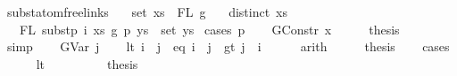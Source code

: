 \begin{isabellebody}
%
\endisatagproof
{\isafoldproof}%
%
\isadelimproof
%
\endisadelimproof
%
\isadelimdocument
%
\endisadelimdocument
%
\isatagdocument
%
\isamarkuptrue%
%
\endisatagdocument
{\isafolddocument}%
%
\isadelimdocument
%
\endisadelimdocument
{}\isamarkupfalse%
\ subst{\isacharunderscore}{\kern0pt}atom{\isacharunderscore}{\kern0pt}freelinks{\isacharcolon}{\kern0pt}\isanewline
\ \ \ {\isachardoublequoteopen}set\ xs\ {\isacharequal}{\kern0pt}\ FL\ g{}{\isachardoublequoteclose}\isanewline
\ \ \ {\isachardoublequoteopen}distinct\ xs{\isachardoublequoteclose}\isanewline
\ \ \ {\isachardoublequoteopen}FL\ {\isacharparenleft}{\kern0pt}subst{\isacharunderscore}{\kern0pt}p\ i\ xs\ g{}\ p\ ys{\isacharparenright}{\kern0pt}\ {\isacharequal}{\kern0pt}\ set\ ys{\isachardoublequoteclose}\isanewline
%
\isadelimproof
%
\endisadelimproof
%
\isatagproof
{}\isamarkupfalse%
\ {\isacharparenleft}{\kern0pt}cases\ p{\isacharparenright}{\kern0pt}\isanewline
\ \ \isamarkupfalse%
\ {\isacharparenleft}{\kern0pt}GConstr\ x{}{\isacharparenright}{\kern0pt}\isanewline
\ \ \isamarkupfalse%
\ \isamarkupfalse%
\ {\isacharquery}{\kern0pt}thesis\isanewline
\ \ \isamarkupfalse%
\ simp\isanewline
{}\isamarkupfalse%
\isanewline
\ \ \isamarkupfalse%
\ {\isacharparenleft}{\kern0pt}GVar\ j{\isacharparenright}{\kern0pt}\isanewline
\ \ \isamarkupfalse%
\ {\isacharparenleft}{\kern0pt}lt{\isacharparenright}{\kern0pt}\ {\isachardoublequoteopen}i\ {\isacharless}{\kern0pt}\ j{\isachardoublequoteclose}\ {\isacharbar}{\kern0pt}\ {\isacharparenleft}{\kern0pt}eq{\isacharparenright}{\kern0pt}\ {\isachardoublequoteopen}i\ {\isacharequal}{\kern0pt}\ j{\isachardoublequoteclose}\ {\isacharbar}{\kern0pt}\ {\isacharparenleft}{\kern0pt}gt{\isacharparenright}{\kern0pt}\ {\isachardoublequoteopen}j\ {\isacharless}{\kern0pt}\ i{\isachardoublequoteclose}\isanewline
\ \ \ \ \isamarkupfalse%
\ arith\isanewline
\ \ \isamarkupfalse%
\ \isamarkupfalse%
\ {\isacharquery}{\kern0pt}thesis\isanewline
\ \ \isamarkupfalse%
\ cases\isanewline
\ \ \ \ \isamarkupfalse%
\ lt\isanewline
\ \ \ \ \ \ \isamarkupfalse%
\ \isamarkupfalse%
\ {\isacharquery}{\kern0pt}thesis\isanewline

\end{isabellebody}
